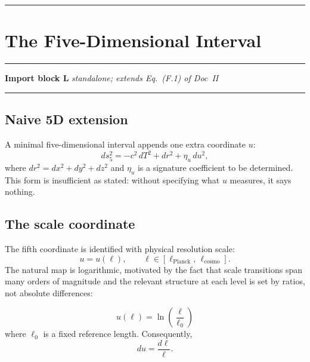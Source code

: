 \documentclass[11pt, a4paper, oneside]{article}
\theoremstyle{definition}
\theoremstyle{plain}
\theoremstyle{remark}
\newcommand{\dsfive}{ds_5^2}
\begin{document}
\noindent\rule{\linewidth}{0.4pt}

\section{The Five-Dimensional Interval}
\label{sec:5D_interval}

\noindent\rule{\linewidth}{0.8pt}
\textbf{Import block L} \hfill \textit{standalone; extends Eq.~(F.1) of Doc~II}
\noindent\rule{\linewidth}{0.4pt}

\subsection{Naive 5D extension}

A minimal five-dimensional interval appends one extra coordinate $u$:
\begin{equation}
  \dsfive = -c^2\,dT^2 + dr^2 + \eta_u\,du^2,
  \label{eq:5D_naive}
\end{equation}
where $dr^2 = dx^2 + dy^2 + dz^2$ and $\eta_u$ is a signature
coefficient to be determined.
This form is insufficient as stated: without specifying what $u$
measures, it says nothing.

\subsection{The scale coordinate}
\label{sec:scale_coord}

The fifth coordinate is identified with physical resolution scale:
\begin{equation}
  u = u(\ell),
  \qquad \ell \in [\ell_\mathrm{Planck},\, \ell_\mathrm{cosmo}].
  \label{eq:u_def}
\end{equation}
The natural map is logarithmic, motivated by the fact that scale
transitions span many orders of magnitude and the relevant structure
at each level is set by ratios, not absolute differences:

\begin{equation}
  \boxed{u(\ell) = \ln\!\left(\frac{\ell}{\ell_0}\right)}
  \label{eq:log_coord}
\end{equation}
where $\ell_0$ is a fixed reference length.
Consequently,
\begin{equation}
  du = \frac{d\ell}{\ell}.
  \label{eq:du}
\end{equation}
\end{document}
